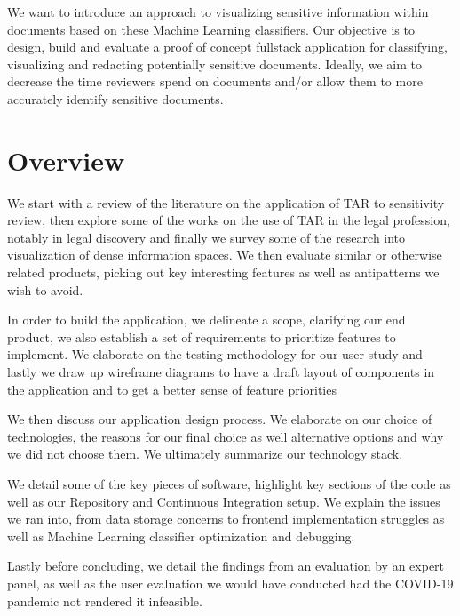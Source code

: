 \documentclass[\version]{l4proj}
\begin{document}
We want to introduce an approach to visualizing sensitive information within documents based on these Machine Learning classifiers.
Our objective is to design, build and evaluate a proof of concept fullstack application for classifying, visualizing and redacting potentially sensitive documents.
Ideally, we aim to decrease the time reviewers spend on documents and/or allow them to more accurately identify sensitive documents.

\section{Overview}

We start with a review of the literature on the application of TAR to sensitivity review, then explore some of the works on the use of TAR in the legal profession, notably in legal discovery and finally we survey some of the research into visualization of dense information spaces.
We then evaluate similar or otherwise related products, picking out key interesting features as well as antipatterns we wish to avoid.

In order to build the application, we delineate a scope, clarifying our end product, we also establish a set of requirements to prioritize features to implement.
We elaborate on the testing methodology for our user study and lastly we draw up wireframe diagrams to have a draft layout of components in the application and to get a better sense of feature priorities

We then discuss our application design process. We elaborate on our choice of technologies, the reasons for our final choice as well alternative options and why we did not choose them. We ultimately summarize our technology stack.

We detail some of the key pieces of software, highlight key sections of the code as well as our Repository and Continuous Integration setup.
We explain the issues we ran into, from data storage concerns to frontend implementation struggles as well as Machine Learning classifier optimization and debugging.

Lastly before concluding, we detail the findings from an evaluation by an expert panel, as well as the user evaluation we would have conducted had the COVID-19 pandemic not rendered it infeasible.


\end{document}
